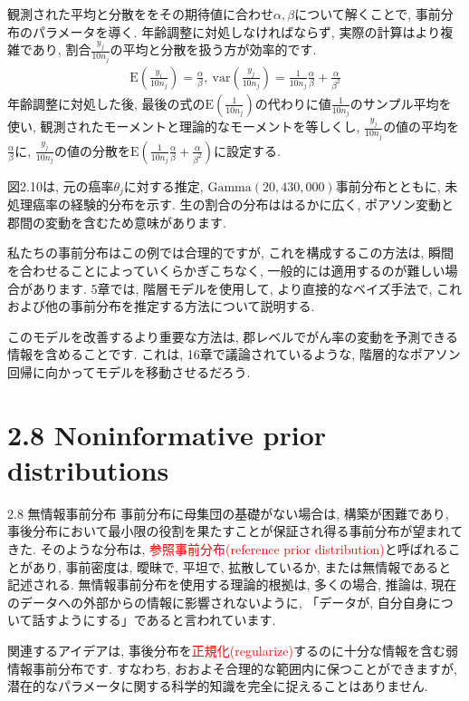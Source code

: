 \documentclass[10pt,dvipdfmx,a4]{beamer}
\newcommand{\eq}[1]{\begin{align}#1\end{align}}
\newcommand{\tcr}[1]{\textcolor{red}{#1}}
\begin{document}

\begin{frame}
観測された平均と分散ををその期待値に合わせ$\alpha, \beta$について解くことで, 事前分布のパラメータを導く.
年齢調整に対処しなければならず, 実際の計算はより複雑であり, 割合$\tfrac{y_j}{10n_j}$の平均と分散を扱う方が効率的です.
\eq{\text{E}\left(\frac{y_i}{10n_j}\right)=\frac{\alpha}{\beta},\ \text{var}\left(\frac{y_j}{10n_j}\right)=\frac{1}{10n_j}\frac{\alpha}{\beta}+\frac{\alpha}{\beta^2}}
年齢調整に対処した後, 最後の式の$\text{E}\left(\frac{1}{10n_j}\right)$の代わりに値$\frac{1}{10n_j}$のサンプル平均を使い, 観測されたモーメントと理論的なモーメントを等しくし, $\frac{y_j}{10n_j}$の値の平均を$\frac{\alpha}{\beta}$に, $\frac{y_j}{10n_j}$の値の分散を$\text{E}\left(\frac{1}{10n_j}\frac{\alpha}{\beta}+\frac{\alpha}{\beta^2}\right)$に設定する.
\end{frame}


\begin{frame}
図2.10は, 元の癌率$\theta_j$に対する推定, $\text{Gamma}(20,430,000)$事前分布とともに, 未処理癌率の経験的分布を示す.
生の割合の分布ははるかに広く, ポアソン変動と郡間の変動を含むため意味があります.

私たちの事前分布はこの例では合理的ですが, これを構成するこの方法は, 瞬間を合わせることによっていくらかぎこちなく, 一般的には適用するのが難しい場合があります.
5章では, 階層モデルを使用して, より直接的なベイズ手法で, これおよび他の事前分布を推定する方法について説明する.

このモデルを改善するより重要な方法は, 郡レベルでがん率の変動を予測できる情報を含めることです.
これは, 16章で議論されているような, 階層的なポアソン回帰に向かってモデルを移動させるだろう.
\end{frame}

\section{2.8 Noninformative prior distributions}
\begin{frame}{2.8 無情報事前分布}
事前分布に母集団の基礎がない場合は, 構築が困難であり, 事後分布において最小限の役割を果たすことが保証され得る事前分布が望まれてきた.
そのような分布は, \tcr{参照事前分布(reference prior distribution)}と呼ばれることがあり, 事前密度は, 曖昧で, 平坦で, 拡散しているか, または無情報であると記述される.
無情報事前分布を使用する理論的根拠は, 多くの場合, 推論は, 現在のデータへの外部からの情報に影響されないように, 「データが, 自分自身について話すようにする」であると言われています.

関連するアイデアは, 事後分布を\tcr{正規化(regularize)}するのに十分な情報を含む弱情報事前分布です.
すなわち, おおよそ合理的な範囲内に保つことができますが, 潜在的なパラメータに関する科学的知識を完全に捉えることはありません.
\end{frame}
\end{document}
